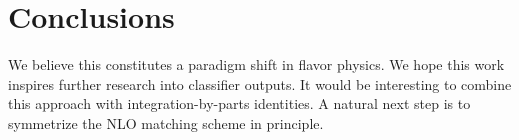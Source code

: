 \section{Conclusions}\label{sec:conclusions}

We believe this constitutes a paradigm shift in flavor physics. We hope
this work inspires further research into classifier outputs. It would be
interesting to combine this approach with integration-by-parts
identities. A natural next step is to symmetrize the NLO matching scheme
in principle.

